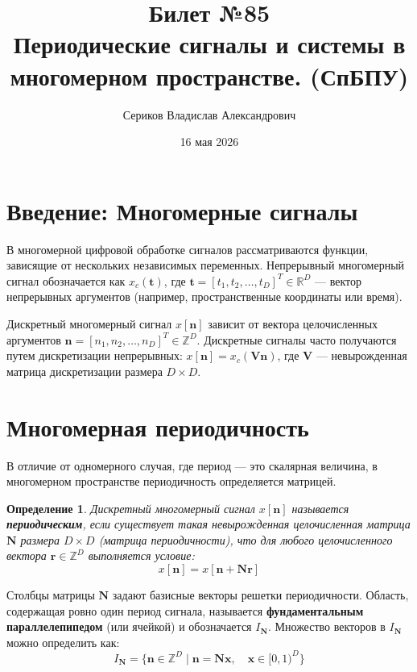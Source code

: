 \documentclass[12pt,a4paper]{article}
\title{Билет №85 \\ \small Периодические сигналы и системы в многомерном пространстве. (СпБПУ)}
\author{Сериков Владислав Александрович}
\date{16 мая 2026}
\newtheorem{definition}{Определение}
\begin{document}
\maketitle
\tableofcontents
\newpage

\section{Введение: Многомерные сигналы}

В многомерной цифровой обработке сигналов рассматриваются функции, зависящие от нескольких независимых переменных. Непрерывный многомерный сигнал обозначается как $x_c(\mathbf{t})$, где $\mathbf{t} = [t_1, t_2, \dots, t_D]^T \in \mathbb{R}^D$ — вектор непрерывных аргументов (например, пространственные координаты или время).

Дискретный многомерный сигнал $x[\mathbf{n}]$ зависит от вектора целочисленных аргументов $\mathbf{n} = [n_1, n_2, \dots, n_D]^T \in \mathbb{Z}^D$. Дискретные сигналы часто получаются путем дискретизации непрерывных: $x[\mathbf{n}] = x_c(\mathbf{Vn})$, где $\mathbf{V}$ — невырожденная матрица дискретизации размера $D \times D$.

\section{Многомерная периодичность}

В отличие от одномерного случая, где период — это скалярная величина, в многомерном пространстве периодичность определяется матрицей.

\begin{definition}
Дискретный многомерный сигнал $x[\mathbf{n}]$ называется \textbf{периодическим}, если существует такая невырожденная целочисленная матрица $\mathbf{N}$ размера $D \times D$ (матрица периодичности), что для любого целочисленного вектора $\mathbf{r} \in \mathbb{Z}^D$ выполняется условие:
\begin{equation}
    x[\mathbf{n}] = x[\mathbf{n} + \mathbf{N}\mathbf{r}]
\end{equation}
\end{definition}

Столбцы матрицы $\mathbf{N}$ задают базисные векторы решетки периодичности. Область, содержащая ровно один период сигнала, называется \textbf{фундаментальным параллелепипедом} (или ячейкой) и обозначается $I_{\mathbf{N}}$. Множество векторов в $I_{\mathbf{N}}$ можно определить как:
\begin{equation}
    I_{\mathbf{N}} = \{ \mathbf{n} \in \mathbb{Z}^D \mid \mathbf{n} = \mathbf{N}\mathbf{x}, \quad \mathbf{x} \in [0, 1)^D \}
\end{equation}
\end{document}
